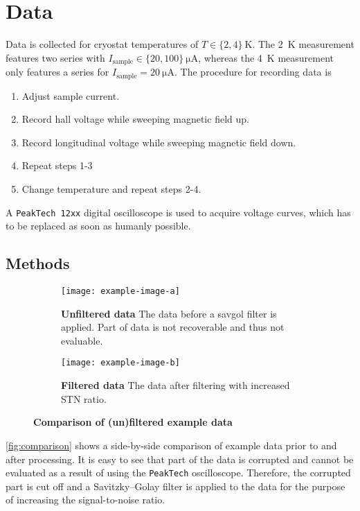 \chapter{Data}
Data is collected for cryostat temperatures of $T\in\{ 2,4\}\ \si{\kelvin}$.
The \SI{2}{\kelvin} measurement features two series with $I_\text{sample}\in\{ 20,100\}\ \si{\micro\ampere}$, whereas the \SI{4}{\kelvin} measurement only features a series for $I_\text{sample}=\SI{20}{\micro\ampere}$.
The procedure for recording data is
\begin{enumerate}
	\item Adjust sample current.
	\item Record hall voltage while sweeping magnetic field up.
	\item Record longitudinal voltage while sweeping magnetic field down.
	\item Repeat steps 1-3
	\item Change temperature and repeat steps 2-4.
\end{enumerate}
A \texttt{PeakTech 12xx} digital oscilloscope is used to acquire voltage curves, which has to be replaced as soon as humanly possible.

\section{Methods} %
\begin{figure}
	\centering
	\begin{subfigure}{.48\textwidth}
		\centering
		\texttt{[image: example-image-a]}
		\caption{\textbf{Unfiltered data} The data before a savgol filter is applied. Part of data is not recoverable and thus not evaluable.}
	\end{subfigure}
	\hspace*{\fill}
	\begin{subfigure}{.48\textwidth}
		\centering
		\texttt{[image: example-image-b]}
		\caption{\textbf{Filtered data} The data after filtering with increased STN ratio.}
	\end{subfigure}
	\caption[Comparison of (un)filtered example data]{\textbf{Comparison of (un)filtered example data}}
	\label{fig:comparison}
\end{figure}
\autoref{fig:comparison} shows a side-by-side comparison of example data prior to and after processing.
It is easy to see that part of the data is corrupted and cannot be evaluated as a result of using the \texttt{PeakTech} oscilloscope.
Therefore, the corrupted part is cut off and a Savitzky–Golay filter is applied to the data for the purpose of increasing the signal-to-noise ratio.

